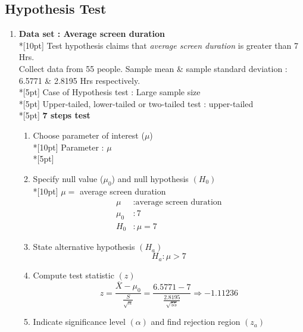 \subsection*{Hypothesis Test}
\begin{enumerate}
    \item \textbf{Data set : Average screen duration}\\*[10pt]
        Test hypothesis claims that \textit{average screen duration} is greater than 7 Hrs.\\
        Collect data from 55 people. Sample mean & sample standard deviation : 6.5771 \& 2.8195 Hrs respectively.\\*[5pt]
        Case of Hypothesis test : Large sample size\\*[5pt]
        Upper-tailed, lower-tailed or two-tailed test : upper-tailed\\*[5pt]
        \textbf{7 steps test}
        \begin{enumerate}[label=1.\arabic*]
            \item Choose parameter of interest (\(\mu\))\\*[10pt]
                Parameter : \(\mu\)\\*[5pt]
            \item Specify null value (\(\mu_0\)) and null hypothesis \((H_0)\)\\*[10pt]
                \(\mu=\) average screen duration
            \begin{equation}
                \begin{split}
                    \mu &: \textrm{average screen duration}\\
                    \mu_0 &: 7\\
                    H_0 &: \mu = 7
                \end{split}
            \end{equation}
            \item State alternative hypothesis \((H_a)\)
            \begin{equation}
                H_a : \mu > 7
            \end{equation}
            \item Compute test statistic \((z)\)
            \begin{equation}
                    z = \dfrac{\overline{X}-\mu_0}{\frac{S}{\sqrt{n}}} = \dfrac{6.5771-7}{\frac{2.8195}{\sqrt{55}}} \Rightarrow -1.11236
            \end{equation}
            \item Indicate significance level \((\alpha)\) and find rejection region \((z_a)\)

\end{enumerate}
\end{enumerate}
